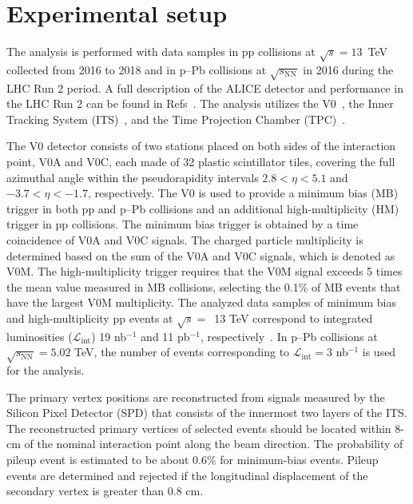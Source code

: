 

\section{Experimental setup}
\label{sec:experiment}

The analysis is performed with data samples in pp collisions at $\sqrt{s} = 13$~TeV collected from 2016 to 2018 and in p--Pb collisions at $\sqrt{s_\mathrm{NN}}$ in 2016 during the LHC Run 2 period. A full description of the ALICE detector and performance in the LHC Run 2 can be found in Refs~\cite{Aamodt:2008zz,Abelev:2014ffa}. The analysis utilizes the V0~\cite{Abbas:2013taa}, the Inner Tracking System (ITS)~\cite{aliceITS}, and the Time Projection Chamber (TPC)~\cite{aliceTPC}. 

The V0 detector consists of two stations placed on both sides of the interaction point, V0A and V0C, each made of 32 plastic scintillator tiles, covering the full azimuthal angle within the pseudorapidity intervals $2.8 < \eta < 5.1$ and $-3.7 < \eta < -1.7$, respectively. The V0 is used to provide a minimum bias (MB) trigger in both pp and p--Pb collisions and an additional high-multiplicity (HM) trigger in pp collisions. The minimum bias trigger is obtained by a time coincidence of V0A and V0C signals. The charged particle multiplicity is determined based on the sum of the V0A and V0C signals, which is denoted as V0M. The high-multiplicity trigger requires that the V0M signal exceeds 5 times the mean value measured in MB collisions, selecting the 0.1\% of MB events that have the largest V0M multiplicity. The analyzed data samples of minimum bias and high-multiplicity pp events at $\sqrt{s}=$~13 TeV correspond to integrated luminosities ($\mathcal{L}_\mathrm{int}$) 19 nb$^{-1}$ and 11 pb$^{-1}$, respectively~\cite{ALICE-PUBLIC-2016-002}. In p--Pb collisions at $\sqrt{s_\mathrm{NN}} = 5.02$ TeV, the number of events corresponding to $\mathcal{L}_\mathrm{int} = 3$ nb$^{-1}$ is used for the analysis. 

The primary vertex positions are reconstructed from signals measured by the Silicon Pixel Detector (SPD) that consists of the innermost two layers of the ITS. The reconstructed primary vertices of selected events should be located within 8-cm of the nominal interaction point along the beam direction. The probability of pileup event is estimated to be about 0.6\% for minimum-bias events. Pileup events are determined and rejected if the longitudinal displacement of the secondary vertex is greater than 0.8 cm. 


